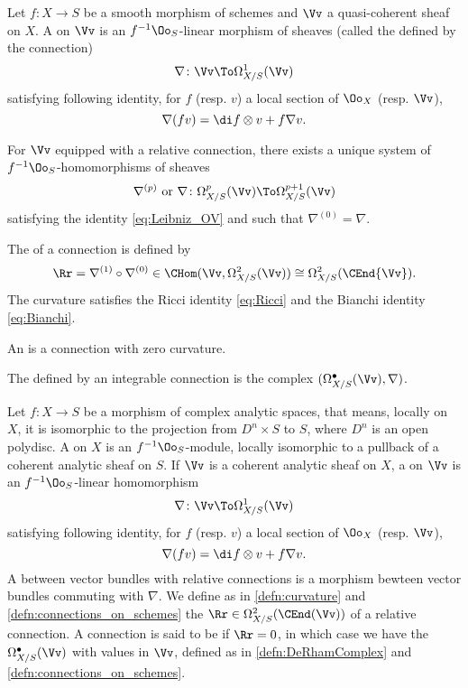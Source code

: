 \begin{definition}\label{defn:connections_on_schemes}
  \begin{paras}
    \item Let $f\colon X\to S$ be a smooth morphism of schemes and $\Vv$ a
    quasi-coherent sheaf on $X$. A  on $\Vv$ is an
    $f^{-1}\Oo_S$-linear morphism of sheaves
    (called the  defined by the connection)
    \[
    \nabla\colon\Vv\To\Omega_{X/S}^1(\Vv)
    \]
    satisfying following identity, for $f$ (resp. $v$) a local section of
    $\Oo_X$ (resp. $\Vv$),
    \[
    \nabla(fv) = \di f\otimes v + f\nabla v.
    \]
    \item For $\Vv$ equipped with a relative connection, there exists a unique
    system of $f^{-1}\Oo_S$-homomorphisms of sheaves
    \[
    \nabla^{(p)}\text{ or }\nabla\colon
    \Omega_{X/S}^p(\Vv)\To\Omega_{X/S}^{p+1}(\Vv)
    \]
    satisfying the identity \cref{eq:Leibniz_OV} and such that
    $\nabla^{(0)}=\nabla$.
    \item The  of a connection is defined by
    \[
    \Rr=\nabla^{(1)}\circ\nabla^{(0)} \in
    \CHom(\Vv,\Omega_{X/S}^2(\Vv))\cong\Omega_{X/S}^2(\CEnd{\Vv}).
    \]
    The curvature satisfies the Ricci identity \cref{eq:Ricci} and the Bianchi
    identity \cref{eq:Bianchi}.
    \item An  is a connection with zero curvature.
    \item The  defined by an integrable connection is
    the complex $(\Omega_{X/S}^\bullet(\Vv),\nabla)$.
  \end{paras}
\end{definition}

\begin{para}\label{defn:relative_connections}
  Let $f\colon X\to S$ be a  morphism of complex analytic spaces,
  that means, locally on $X$, it is isomorphic to the projection from
  $D^n\times S$ to $S$, where $D^n$ is an open polydisc.
  A  on $X$ is an $f^{-1}\Oo_S$-module, locally
  isomorphic to a pullback of a coherent analytic sheaf on $S$.
  If $\Vv$ is a coherent analytic sheaf on $X$, a 
  on $\Vv$ is an $f^{-1}\Oo_S$-linear homomorphism
  \[
  \nabla\colon\Vv\To\Omega_{X/S}^1(\Vv)
  \]
  satisfying following identity, for $f$ (resp. $v$) a local section of
  $\Oo_X$ (resp. $\Vv$),
  \[
  \nabla(fv) = \di f\otimes v + f\nabla v.
  \]
  A  between vector bundles with relative
  connections is a morphism bewteen vector bundles commuting with $\nabla$.
  We define as in \ref{defn:curvature} and \ref{defn:connections_on_schemes}
  the  $\Rr\in\Omega_{X/S}^2(\CEnd(\Vv))$ of a relative
  connection. A connection is said to be  if $\Rr=0$,
  in which case we have the 
  $\Omega_{X/S}^\bullet(\Vv)$ with values in $\Vv$, defined as in
  \ref{defn:DeRhamComplex} and \ref{defn:connections_on_schemes}.
\end{para}

